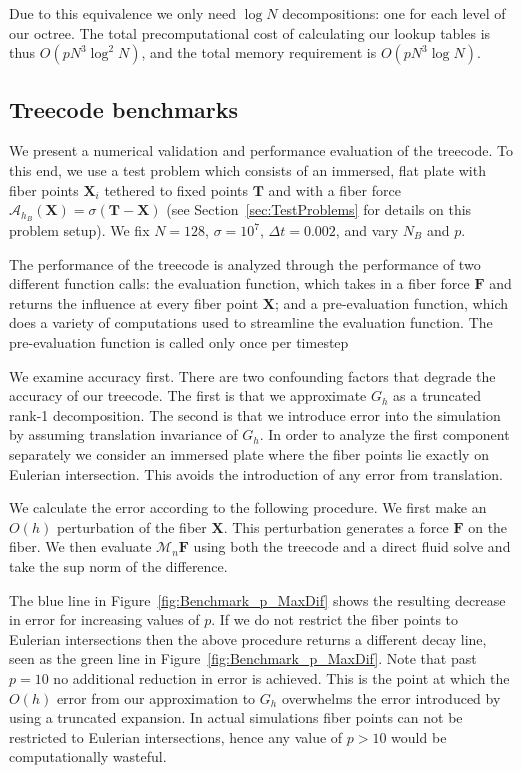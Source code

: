 \documentclass[preprint,12pt]{elsarticle}
\newcommand{\B}[1]{\mathbf{#1}}
\newcommand{\C}[1]{\mathcal{#1}}
\begin{document}
Due to this equivalence we only need $\log N$ decompositions: one for each level of our octree.
The total precomputational cost of calculating our lookup tables is thus $O(pN^3\log^2 N)$, and the total memory requirement is $O(pN^3\log N)$.


\subsection{Treecode benchmarks}
\label{Sec:Teecode_Benchmarks}
We present a numerical validation and performance evaluation of the treecode. To this end, we use a test problem which consists of 
an immersed, flat plate with fiber points $\mathbf{X}_i$ tethered to fixed points $\mathbf{T}$ and with a fiber force  $\C{A}_{h_B}(\B{X}) = \sigma(\B{T} - \B{X})$ (see Section~\ref{sec:TestProblems} for details on this problem setup).  We fix $N=128$, $\sigma=10^7$, $\Delta t=0.002$,  and vary $N_B$ and $p$.

 The performance of the treecode is analyzed through the performance of two different function calls: the evaluation function, which takes in a fiber force $\B{F}$ and returns the influence at every fiber point $\B{X}$; and a pre-evaluation function, which does a variety of computations used to streamline the evaluation function. The pre-evaluation function is called only once per timestep

We examine accuracy first. There are two confounding factors that degrade the accuracy of our treecode. The first is that we approximate $G_h$ as a truncated rank-1 decomposition. The second is that we introduce error into the simulation by assuming translation invariance of $G_h$. In order to analyze the first component separately we consider an immersed plate where the fiber points lie exactly on Eulerian intersection. This avoids the introduction of any error from translation.

We calculate the error according to the following procedure. We first make an $O(h)$ perturbation of the fiber $\B{X}$. This perturbation generates a force $\B{F}$ on the fiber. We then evaluate $\C{M}_n\B{F}$ using both the treecode and a direct fluid solve and take the sup norm of the difference.

The blue line in Figure~\ref{fig:Benchmark_p_MaxDif} shows the resulting decrease in error for increasing values of $p$. If we do not restrict the fiber points to Eulerian intersections then the above procedure returns a different decay line, seen as the green line in Figure~\ref{fig:Benchmark_p_MaxDif}. Note that past $p=10$ no additional reduction in error is achieved. This is the point at which the $O(h)$ error from our approximation to $G_h$ overwhelms the error introduced by using a truncated expansion. In actual simulations fiber points can not be restricted to Eulerian intersections, hence any value of $p > 10$ would be computationally wasteful.
\end{document}
